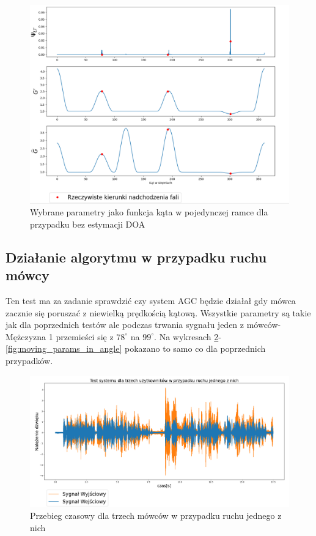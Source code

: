 \begin{figure}[h!]
    \centering
    \includegraphics[width=\textwidth]{Images/multi_user_params_in_angle.png}
    \caption{Wybrane parametry jako funkcja kąta w pojedynczej ramce dla przypadku bez estymacji DOA}
    \label{fig:multi_user_no_doa_params_in_angle}
\end{figure}

\subsection{Działanie algorytmu w przypadku ruchu mówcy}

Ten test ma za zadanie sprawdzić czy system AGC będzie działał gdy mówca zacznie się poruszać z niewielką prędkością kątową. Wszystkie parametry są takie jak dla poprzednich testów ale podczas trwania sygnału jeden z mówców- Mężczyzna 1 przemieści się z $78^{\circ} $ na $ 99^{\circ}$.
Na wykresach \ref{fig:moving}-\ref{fig:moving_params_in_angle} pokazano to samo co dla poprzednich przypadków.

\begin{figure}[h!]
    \centering
    \includegraphics[width=\textwidth]{Images/moving.png}
    \caption{Przebieg czasowy dla trzech mówców w przypadku ruchu jednego z nich}
    \label{fig:moving}
\end{figure}

